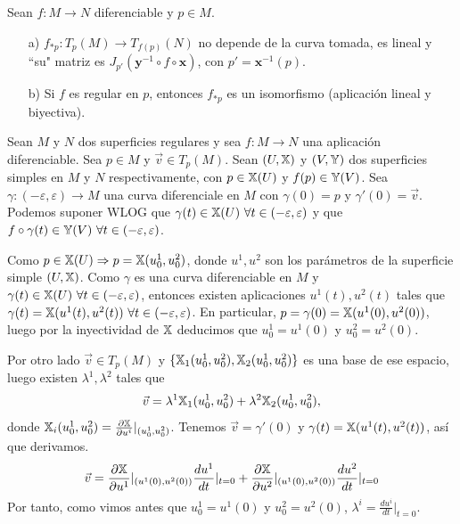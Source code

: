 \documentclass[twoside]{report}
\begin{document}
\begin{teorema}
Sean $f:M\rightarrow N$ diferenciable y $p\in M$.
\begin{itemize}

\item [a)]
$f_{*p}: T_p (M)\rightarrow T_{f(p)}(N)$ no depende de la curva tomada, es lineal y ``su" matriz es $J_{p'}(\textbf{y}^{-1}\circ f \circ \textbf{x})$, con $p'= \textbf{x}^{-1}(p)$.
\item [b)]
Si $f$ es regular en $p$, entonces $f_{*p}$ es un isomorfismo (aplicación lineal y biyectiva).
\end{itemize}
\end{teorema}
\begin{dem}
Sean $M$ y $N$ dos superficies regulares y sea $f:M\to N$ una aplicación diferenciable. Sea $p\in M$ y $\vec{v}\in T_p(M)$. Sean $(U,\mathbb{X})$ y $(V,\mathbb{Y})$ dos superficies simples en $M$ y $N$ respectivamente, con $p\in\mathbb{X}(U)$ y $f(p)\in\mathbb{Y}(V)$. Sea $\gamma:(-\varepsilon,\varepsilon)\to M$ una curva diferenciale en $M$ con $\gamma(0)=p$ y $\gamma'(0)=\vec{v}$. Podemos suponer WLOG que $\gamma(t)\in\X(U)\ \forall t\in(-\varepsilon,\varepsilon)$ y que $f\circ\gamma(t)\in\mathbb{Y}(V)\ \forall t\in(-\varepsilon,\varepsilon)$.  

Como $p\in\mathbb{X}(U)\Rightarrow p=\mathbb{X}(u_0^1,u_0^2)$, donde $u^1,u^2$ son los parámetros de la superficie simple $(U,\mathbb{X})$. Como $\gamma$ es una curva diferenciable en $M$ y $\gamma(t)\in\X(U)\ \forall t\in(-\varepsilon,\varepsilon)$, entonces existen aplicaciones $u^1(t),u^2(t)$ tales que $\gamma(t)=\X(u^1(t),u^2(t))\ \forall t\in(-\varepsilon,\varepsilon)$. En particular, $p=\gamma(0)=\mathbb{X}(u^1(0),u^2(0))$, luego por la inyectividad de $\mathbb{X}$ deducimos que $u^1_0=u^1(0)$ y $u^2_0=u^2(0)$.  

Por otro lado $\vec{v}\in T_p(M)$ y $\{\mathbb{X}_1(u^1_0,u^2_0),\mathbb{X}_2(u^1_0, u^2_0)\}$ es una base de ese espacio, luego existen $\lambda^1,\lambda^2$ tales que 
$$\vec{v}=\lambda^1\mathbb{X}_1(u^1_0,u^2_0)+\lambda^2\mathbb{X}_2(u^1_0,u^2_0),$$
donde $\mathbb{X}_i(u^1_0,u^2_0)=\frac{\partial\mathbb{X}}{\partial u^i}|_{(u^1_0,u^2_0)}$. Tenemos $\vec{v}=\gamma'(0)$ y $\gamma(t)=\mathbb{X}(u^1(t),u^2(t))$, así que derivamos.
$$\vec{v}=\frac{\partial\mathbb{X}}{\partial u^1}|_{(u^1(0),u^2(0))}\frac{du^1}{dt}|_{t=0}+\frac{\partial\mathbb{X}}{\partial u^2}|_{(u^1(0),u^2(0))}\frac{du^2}{dt}|_{t=0}$$
Por tanto, como vimos antes que $u^1_0=u^1(0)$ y $u^2_0=u^2(0)$, $\lambda^i= \frac{du^i}{dt}|_{t=0}$. 


\end{dem}
\end{document}
